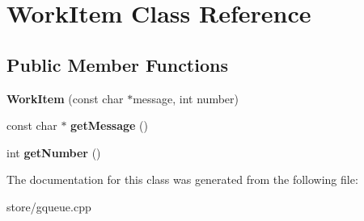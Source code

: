 \hypertarget{classWorkItem}{\section{Work\-Item Class Reference}
\label{classWorkItem}
}
\subsection*{Public Member Functions}
\begin{DoxyCompactItemize}
\item 
\hypertarget{classWorkItem_ac77d1e967d872c2ceb4de4ea3ac45c78}{{\bfseries Work\-Item} (const char $\ast$message, int number)}\label{classWorkItem_ac77d1e967d872c2ceb4de4ea3ac45c78}

\item 
\hypertarget{classWorkItem_a5e25f8c72fd1213c9e975c988e2a96c4}{const char $\ast$ {\bfseries get\-Message} ()}\label{classWorkItem_a5e25f8c72fd1213c9e975c988e2a96c4}

\item 
\hypertarget{classWorkItem_a9741f02d319a3843b62ec72b9181f71c}{int {\bfseries get\-Number} ()}\label{classWorkItem_a9741f02d319a3843b62ec72b9181f71c}

\end{DoxyCompactItemize}


The documentation for this class was generated from the following file\-:\begin{DoxyCompactItemize}
\item 
store/gqueue.\-cpp\end{DoxyCompactItemize}
